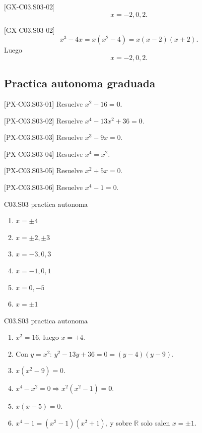 \begin{shortanswer}{[GX-C03.S03-02]}
\[
x=-2,0,2.
\]
\end{shortanswer}

\begin{fullsolution}{[GX-C03.S03-02]}
\[
x^3-4x=x(x^2-4)=x(x-2)(x+2).
\]
Luego
\[
x=-2,0,2.
\]
\end{fullsolution}

\subsection*{Practica autonoma graduada}
\begin{exercise}{[PX-C03.S03-01] Resuelve \(x^2-16=0\).}
\end{exercise}
\begin{exercise}{[PX-C03.S03-02] Resuelve \(x^4-13x^2+36=0\).}
\end{exercise}
\begin{exercise}{[PX-C03.S03-03] Resuelve \(x^3-9x=0\).}
\end{exercise}
\begin{exercise}{[PX-C03.S03-04] Resuelve \(x^4=x^2\).}
\end{exercise}
\begin{exercise}{[PX-C03.S03-05] Resuelve \(x^2+5x=0\).}
\end{exercise}
\begin{exercise}{[PX-C03.S03-06] Resuelve \(x^4-1=0\).}
\end{exercise}

\begin{shortanswer}{C03.S03 practica autonoma}
\begin{enumerate}[label=\textbf{PX-C03.S03-\arabic*:}, leftmargin=*]
  \item \(x=\pm 4\)
  \item \(x=\pm 2,\pm 3\)
  \item \(x=-3,0,3\)
  \item \(x=-1,0,1\)
  \item \(x=0,-5\)
  \item \(x=\pm 1\)
\end{enumerate}
\end{shortanswer}

\begin{fullsolution}{C03.S03 practica autonoma}
\begin{enumerate}[label=\textbf{PX-C03.S03-\arabic*:}, leftmargin=*]
  \item \(x^2=16\), luego \(x=\pm 4\).
  \item Con \(y=x^2\): \(y^2-13y+36=0=(y-4)(y-9)\).
  \item \(x(x^2-9)=0\).
  \item \(x^4-x^2=0 \Longrightarrow x^2(x^2-1)=0\).
  \item \(x(x+5)=0\).
  \item \(x^4-1=(x^2-1)(x^2+1)\), y sobre \(\mathbb{R}\) solo salen \(x=\pm 1\).
\end{enumerate}
\end{fullsolution}

